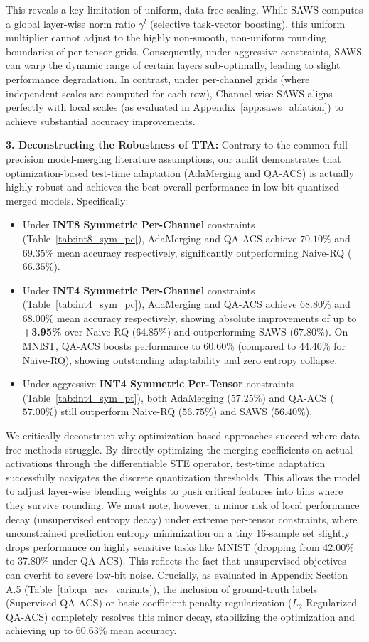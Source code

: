 This reveals a key limitation of uniform, data-free scaling. While SAWS computes a global layer-wise norm ratio $\gamma^l$ (selective task-vector boosting), this uniform multiplier cannot adjust to the highly non-smooth, non-uniform rounding boundaries of per-tensor grids. Consequently, under aggressive constraints, SAWS can warp the dynamic range of certain layers sub-optimally, leading to slight performance degradation. In contrast, under per-channel grids (where independent scales are computed for each row), Channel-wise SAWS aligns perfectly with local scales (as evaluated in Appendix~\ref{app:saws_ablation}) to achieve substantial accuracy improvements.

\textbf{3. Deconstructing the Robustness of TTA:}
Contrary to the common full-precision model-merging literature assumptions, our audit demonstrates that optimization-based test-time adaptation (AdaMerging and QA-ACS) is actually highly robust and achieves the best overall performance in low-bit quantized merged models. Specifically:
\begin{itemize}
  \item Under \textbf{INT8 Symmetric Per-Channel} constraints (Table~\ref{tab:int8_sym_pc}), AdaMerging and QA-ACS achieve $70.10\%$ and $69.35\%$ mean accuracy respectively, significantly outperforming Naive-RQ ($66.35\%$).
  \item Under \textbf{INT4 Symmetric Per-Channel} constraints (Table~\ref{tab:int4_sym_pc}), AdaMerging and QA-ACS achieve $68.80\%$ and $68.00\%$ mean accuracy respectively, showing absolute improvements of up to \textbf{+3.95\%} over Naive-RQ ($64.85\%$) and outperforming SAWS ($67.80\%$). On MNIST, QA-ACS boosts performance to $60.60\%$ (compared to $44.40\%$ for Naive-RQ), showing outstanding adaptability and zero entropy collapse.
  \item Under aggressive \textbf{INT4 Symmetric Per-Tensor} constraints (Table~\ref{tab:int4_sym_pt}), both AdaMerging ($57.25\%$) and QA-ACS ($57.00\%$) still outperform Naive-RQ ($56.75\%$) and SAWS ($56.40\%$).
\end{itemize}

We critically deconstruct why optimization-based approaches succeed where data-free methods struggle. By directly optimizing the merging coefficients on actual activations through the differentiable STE operator, test-time adaptation successfully navigates the discrete quantization thresholds. This allows the model to adjust layer-wise blending weights to push critical features into bins where they survive rounding.
We must note, however, a minor risk of local performance decay (unsupervised entropy decay) under extreme per-tensor constraints, where unconstrained prediction entropy minimization on a tiny 16-sample set slightly drops performance on highly sensitive tasks like MNIST (dropping from 42.00\% to 37.80\% under QA-ACS). This reflects the fact that unsupervised objectives can overfit to severe low-bit noise. Crucially, as evaluated in Appendix Section A.5 (Table~\ref{tab:qa_acs_variants}), the inclusion of ground-truth labels (Supervised QA-ACS) or basic coefficient penalty regularization ($L_2$ Regularized QA-ACS) completely resolves this minor decay, stabilizing the optimization and achieving up to 60.63\% mean accuracy.

